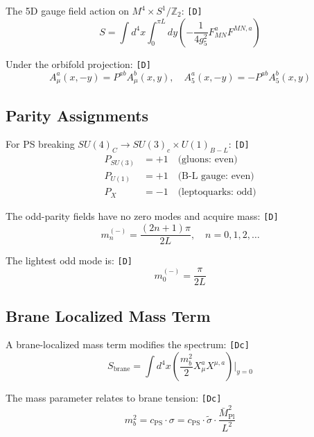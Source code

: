 \documentclass[11pt,a4paper]{article}
\newcommand{\tagD}{\textcolor{green!50!black}{\texttt{[D]}}}
\newcommand{\tagDc}{\textcolor{blue!70!black}{\texttt{[Dc]}}}
\theoremstyle{definition}
\begin{document}
The 5D gauge field action on $M^4 \times S^1/\mathbb{Z}_2$: \tagD{}
\begin{equation}
\label{eq:5d-gauge-action}
S = \int d^4x \int_0^{\pi L} dy \left(-\frac{1}{4g_5^2} F_{MN}^a F^{MN,a}\right)
\end{equation}

Under the orbifold projection: \tagD{}
\begin{equation}
\label{eq:orbifold-projection}
A_\mu^a(x, -y) = P^{ab} A_\mu^b(x, y), \quad A_5^a(x, -y) = -P^{ab} A_5^b(x, y)
\end{equation}

\subsection{Parity Assignments}
\label{app:parity-assignments}

For PS breaking $SU(4)_C \to SU(3)_c \times U(1)_{B-L}$: \tagD{}
\begin{align}
\label{eq:parity-su3}
P_{SU(3)} &= +1 \quad \text{(gluons: even)} \\
\label{eq:parity-u1}
P_{U(1)} &= +1 \quad \text{(B-L gauge: even)} \\
\label{eq:parity-lq}
P_{X} &= -1 \quad \text{(leptoquarks: odd)}
\end{align}

The odd-parity fields have no zero modes and acquire mass: \tagD{}
\begin{equation}
\label{eq:odd-mode-mass}
m_n^{(-)} = \frac{(2n+1)\pi}{2L}, \quad n = 0, 1, 2, \ldots
\end{equation}

The lightest odd mode is: \tagD{}
\begin{equation}
\label{eq:lightest-odd}
m_0^{(-)} = \frac{\pi}{2L}
\end{equation}

\subsection{Brane Localized Mass Term}
\label{app:brane-mass}

A brane-localized mass term modifies the spectrum: \tagDc{}
\begin{equation}
\label{eq:brane-mass-term}
S_{\text{brane}} = \int d^4x \left(\frac{m_b^2}{2} X_\mu^a X^{\mu,a}\right)\bigg|_{y=0}
\end{equation}

The mass parameter relates to brane tension: \tagDc{}
\begin{equation}
\label{eq:mb-sigma-relation}
m_b^2 = c_{\text{PS}} \cdot \sigma = c_{\text{PS}} \cdot \tilde{\sigma} \cdot \frac{\bar{M}_{\text{Pl}}^2}{L^2}
\end{equation}
\end{document}
